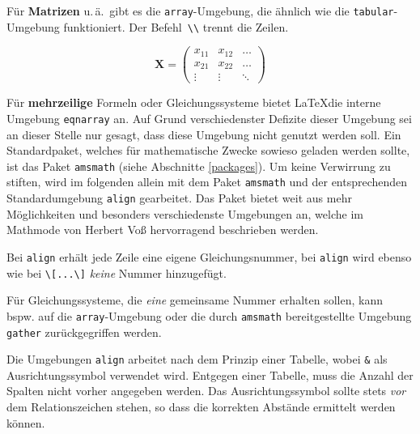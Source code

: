 Für \textbf{Matrizen} u.\,ä.\ gibt es die
\texttt{array}-Umgebung, die ähnlich wie die
\texttt{tabular}-Umgebung funktioniert.
Der Befehl~\lstinline|\\| trennt die Zeilen.

\begin{LTXexample}
\[
\mathbf{X} =
\left( \begin{array}{ccc}
x_{11} & x_{12} & \ldots \\
x_{21} & x_{22} & \ldots \\
\vdots & \vdots & \ddots
\end{array} \right)
\]
\end{LTXexample}


Für \textbf{mehrzeilige} Formeln oder Gleichungssysteme bietet \LaTeX die
interne Umgebung \texttt{eqnarray} an. Auf Grund verschiedenster Defizite
dieser Umgebung sei an dieser Stelle nur gesagt, dass diese Umgebung nicht
genutzt werden soll. Ein Standardpaket, welches für mathematische Zwecke
sowieso geladen werden sollte, ist das Paket \texttt{amsmath} (siehe Abschnitte
\ref{packages}). Um keine Verwirrung zu stiften, wird im folgenden allein mit dem
Paket \texttt{amsmath} und der entsprechenden Standardumgebung \texttt{align}
gearbeitet. Das Paket bietet weit aus mehr Möglichkeiten und besonders verschiedenste
Umgebungen an, welche im Mathmode von Herbert Voß \cite{mathmode} 
hervorragend beschrieben werden.

Bei \texttt{align} erhält jede Zeile eine eigene
Gleichungsnummer, bei \texttt{align} wird ebenso wie bei
\lstinline|\[...\]| \emph{keine} Nummer hinzugefügt.

Für Gleichungssysteme, die \emph{eine} gemeinsame Nummer
erhalten sollen, kann bspw. auf die \texttt{array}-Umgebung oder die durch \texttt{amsmath}
bereitgestellte Umgebung \texttt{gather} zurückgegriffen werden.

Die Umgebungen \texttt{align} arbeitet nach dem Prinzip einer Tabelle, wobei \texttt{\&} als
Ausrichtungssymbol verwendet wird. Entgegen einer Tabelle, muss die Anzahl der Spalten nicht vorher 
angegeben werden. Das Ausrichtungssymbol sollte stets \emph{vor} dem Relationszeichen stehen, so
dass die korrekten Abstände ermittelt werden können. 

